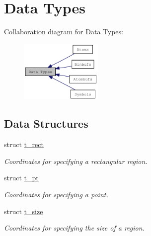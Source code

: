 \hypertarget{group__datatypes}{
\section{Data Types}
\label{group__datatypes}
}


Collaboration diagram for Data Types:\nopagebreak
\begin{figure}[H]
\begin{center}
\leavevmode
\includegraphics[width=112pt]{group__datatypes}
\end{center}
\end{figure}
\subsection*{Data Structures}
\begin{DoxyCompactItemize}
\item 
struct \hyperlink{structt__rect}{t\_\-rect}
\begin{DoxyCompactList}\small\item\em Coordinates for specifying a rectangular region. \item\end{DoxyCompactList}\item 
struct \hyperlink{structt__pt}{t\_\-pt}
\begin{DoxyCompactList}\small\item\em Coordinates for specifying a point. \item\end{DoxyCompactList}\item 
struct \hyperlink{structt__size}{t\_\-size}
\begin{DoxyCompactList}\small\item\em Coordinates for specifying the size of a region. \item\end{DoxyCompactList}\end{DoxyCompactItemize}
